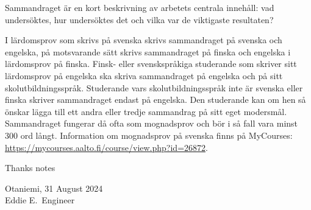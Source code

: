 \documentclass[english, 12pt, a4paper, elec, utf8, a-2b, online]{aaltothesis}
\begin{document}
\begin{abstractpage}[swedish]
Sammandraget är en kort beskrivning av arbetets centrala innehåll: vad
undersöktes, hur undersöktes det och vilka var de viktigaste resultaten?

I lärdomsprov som skrivs på svenska skrivs sammandraget på svenska och engelska,
på motsvarande sätt skrivs sammandraget på finska och engelska i lärdomsprov på
finska. Finsk- eller svenskspråkiga studerande som skriver sitt lärdomsprov på
engelska ska skriva sammandraget på engelska och på sitt skolutbildningsspråk.
Studerande vars skolutbildningsspråk inte är svenska eller finska skriver
sammandraget endast på engelska. Den studerande kan om hen så önskar lägga till
ett andra eller tredje sammandrag på sitt eget modersmål. Sammandraget fungerar
då ofta som mognadsprov och bör i så fall vara minst 300 ord långt. Information
om mognadsprov på svenska finns på MyCourses:\\
\url{https://mycourses.aalto.fi/course/view.php?id=26872}.
\end{abstractpage}


\dothesispagenumbering{}


Thanks notes

\vspace{5cm}
Otaniemi, 31 August 2024\\

\vspace{5mm}
{\hfill Eddie E.\ Engineer \hspace{1cm}}

\newpage


\thesistableofcontents

\cleardoublepage

\newpage
\end{document}

